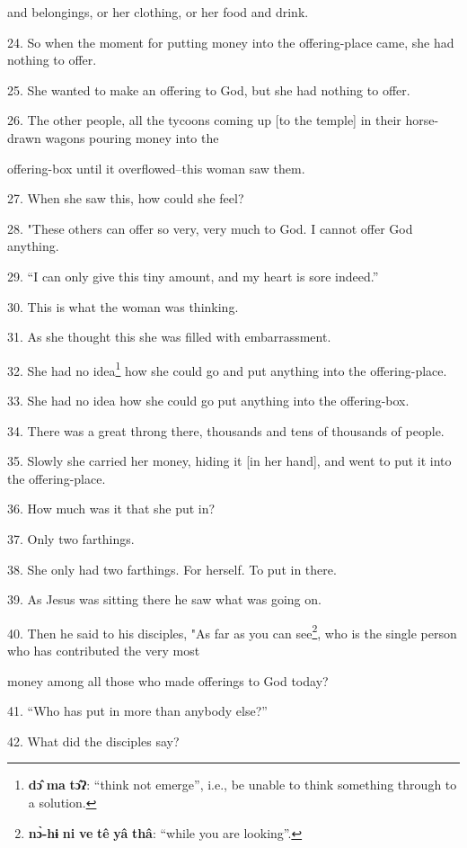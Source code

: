 and belongings, or her clothing, or her food and drink.

24. So when the moment for putting money into the offering-place came, she had nothing
to offer.

25. She wanted to make an offering to God, but she had nothing to offer.

26. The other people, all the tycoons coming up [to the temple] in their horse-drawn
wagons pouring money into the

offering-box until it overflowed--this woman saw them.

27. When she saw this, how could she feel?

28. "These others can offer so very, very much to God. I cannot offer God
anything.

29. ``I can only give this tiny amount, and my heart is sore indeed.''

30. This is what the woman was thinking.

31. As she thought this she was filled with embarrassment.

32. She had no idea\footnote{\textbf{dɔ̂} \textbf{ma} \textbf{tɔ̂ʔ}: ``think not emerge'', i.e., be unable to think something through to a solution.} how she could go and put anything into the offering-place.

33. She had no idea how she could go put anything into the offering-box.

34. There was a great throng there, thousands and tens of thousands of people.

35. Slowly she carried her money, hiding it [in her hand], and went to put it into
the offering-place.

36. How much was it that she put in?

37. Only two farthings.

38. She only had two farthings. For herself. To put in there.

39. As Jesus was sitting there he saw what was going on.

40. Then he said to his disciples, "As far as you can see\footnote{\textbf{nɔ̀-hɨ} \textbf{ni} \textbf{ve} \textbf{tê} \textbf{yâ} \textbf{thâ}: ``while you are looking''.}, who is
the single person who has contributed the very most

money among all those who made offerings to God today?

41. ``Who has put in more than anybody else?''

42. What did the disciples say?

